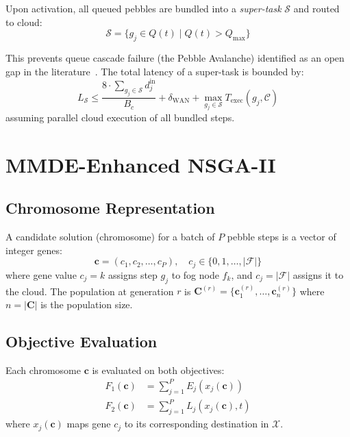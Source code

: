 \documentclass[12pt,a4paper]{article}
\theoremstyle{definition}
\theoremstyle{remark}
\begin{document}
Upon activation, all queued pebbles are bundled into a \emph{super-task}
$\mathcal{S}$ and routed to cloud:
\begin{equation}
  \mathcal{S} = \bigl\{ g_j \in Q(t) \;\big|\; Q(t) > Q_{\max} \bigr\}
\end{equation}

This prevents queue cascade failure (the Pebble Avalanche) identified as an
open gap in the literature~\cite{nouri2024tof}. The total latency of a
super-task is bounded by:
\begin{equation}
  L_{\mathcal{S}} \leq \frac{8 \cdot \sum_{g_j \in \mathcal{S}} d_j^{\text{in}}}{B_c}
  + \delta_{\text{WAN}}
  + \max_{g_j \in \mathcal{S}} T_{\text{exec}}(g_j, \mathcal{C})
\end{equation}
assuming parallel cloud execution of all bundled steps.

\section{MMDE-Enhanced NSGA-II}
\label{sec:nsga2}

\subsection{Chromosome Representation}

A candidate solution (chromosome) for a batch of $P$ pebble steps is a
vector of integer genes:
\begin{equation}
  \mathbf{c} = (c_1, c_2, \ldots, c_P), \quad
  c_j \in \{0, 1, \ldots, |\mathcal{F}|\}
  \label{eq:chromosome}
\end{equation}
where gene value $c_j = k$ assigns step $g_j$ to fog node $f_k$, and
$c_j = |\mathcal{F}|$ assigns it to the cloud. The population at generation
$r$ is $\mathbf{C}^{(r)} = \{\mathbf{c}^{(r)}_1, \ldots, \mathbf{c}^{(r)}_n\}$
where $n = |\mathbf{C}|$ is the population size.

\subsection{Objective Evaluation}

Each chromosome $\mathbf{c}$ is evaluated on both objectives:
\begin{align}
  F_1(\mathbf{c}) &= \sum_{j=1}^{P} E_j(x_j(\mathbf{c}))
  \label{eq:obj1}\\
  F_2(\mathbf{c}) &= \sum_{j=1}^{P} L_j(x_j(\mathbf{c}), t)
  \label{eq:obj2}
\end{align}
where $x_j(\mathbf{c})$ maps gene $c_j$ to its corresponding destination in
$\mathcal{X}$.
\end{document}
